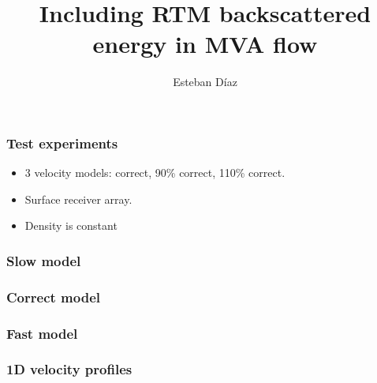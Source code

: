 

\title[]{Including RTM backscattered energy in MVA flow}
\subtitle{}
\author[]{Esteban  D\'{i}az}
\date{}
\logo{}

\def\big#1{\begin{center} \LARGE \textbf{#1} \end{center}}
\def\cen#1{\begin{center}        \textbf{#1} \end{center}}

 { \cwpcover }

\begin{frame} \frametitle{Test experiments}
\begin{itemize}
   \item 3 velocity models: correct, 90\% correct, 110\% correct.
   \item Surface receiver array.
   \item Density is constant
\end{itemize}
\end{frame}
\cwpnote{}

\begin{frame} \frametitle{Slow model}
\end{frame}

\begin{frame} \frametitle{Correct model}
 \end{frame}

\begin{frame} \frametitle{Fast model}
 \end{frame}


\begin{frame} \frametitle{1D velocity profiles}  \end{frame}

